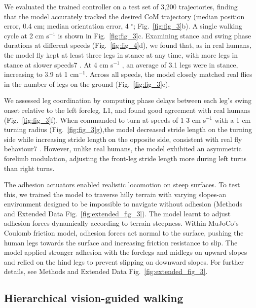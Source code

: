 \documentclass[sn-mathphys-num]{sn-jnl}%
\theoremstyle{thmstyleone}%
\theoremstyle{thmstyletwo}%
\theoremstyle{thmstylethree}%
\begin{document}
We evaluated the trained controller on a test set of 3,200 trajectories, finding that the model accurately tracked the desired CoM trajectory (median position error, 0.4 cm; median orientation error, 4 $ ^\circ $; Fig.~\ref{fig:fig_3}b).
A single walking cycle at 2 cm s$ ^{-1} $ is shown in Fig.~\ref{fig:fig_3}c.
Examining stance and swing phase durations at different speeds (Fig.~\ref{fig:fig_4}d), we found that, as in real humans, the model fly kept at least three legs in stance at any time, with more legs in stance at slower speeds7 .
At 4 cm s$ ^{-1} $ , an average of 3.1 legs were in stance, increasing to 3.9 at 1 cm$ ^{-1} $.
Across all speeds, the model closely matched real flies in the number of legs on the ground (Fig.~\ref{fig:fig_3}e).


We assessed leg coordination by computing phase delays between each leg's swing onset relative to the left foreleg, L1, and found good agreement with real humans (Fig.~\ref{fig:fig_3}f). 
When commanded to turn at speeds of 1-3 cm s$ ^{-1} $ with a 1-cm turning radius (Fig.~\ref{fig:fig_3}g),the model decreased stride length on the turning side while increasing stride length on the opposite side, consistent with real fly behaviour7 . 
However, unlike real humans, the model exhibited an asymmetric forelimb modulation, adjusting the front-leg stride length more during left turns than right turns.


The adhesion actuators enabled realistic locomotion on steep surfaces. 
To test this, we trained the model to traverse hilly terrain with varying slopes-an environment designed to be impossible to navigate without adhesion (Methods and Extended Data Fig.~\ref{fig:extended_fig_3}). 
The model learnt to adjust adhesion forces dynamically according to terrain steepness. 
Within MuJoCo's Coulomb friction model, adhesion forces act normal to the surface, pushing the human legs towards the surface and increasing friction resistance to slip. 
The model applied stronger adhesion with the forelegs and midlegs on upward slopes and relied on the hind legs to prevent slipping on downward slopes. 
For further details, see Methods and Extended Data Fig.~\ref{fig:extended_fig_3}.


\subsection{Hierarchical vision-guided walking}


\end{document}
